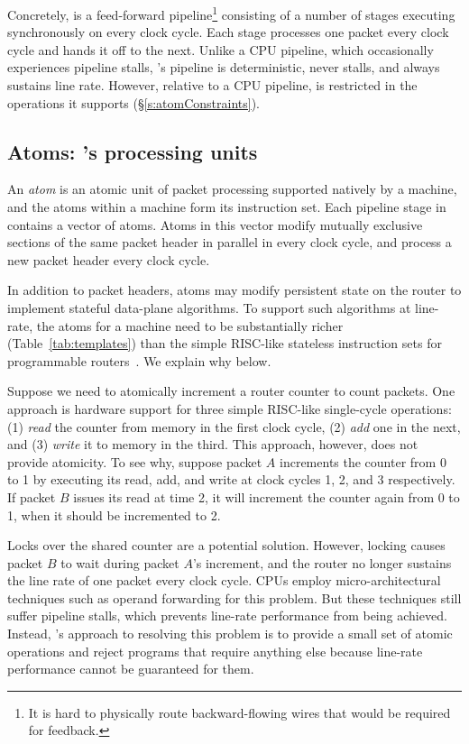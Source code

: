  Concretely, \absmachine is a feed-forward pipeline\footnote{It is hard to
physically route backward-flowing wires that would be required for feedback.}
consisting of a number of stages executing synchronously on every clock cycle.
Each stage processes one packet every clock cycle and hands it off to the next.
Unlike a CPU pipeline, which occasionally experiences pipeline stalls,
\absmachine's pipeline is deterministic, never stalls, and always sustains line
rate. However, relative to a CPU pipeline, \absmachine is restricted in the
operations it supports (\S\ref{s:atomConstraints}).

\subsection{Atoms: \absmachine's processing units}
\label{ss:atoms}
 An {\em atom} is an atomic unit of packet processing supported natively by a
\absmachine machine, and the atoms within a \absmachine machine form its
instruction set. Each pipeline stage in \absmachine contains a vector of atoms.
Atoms in this vector modify mutually exclusive sections of the same packet
header in parallel in every clock cycle, and process a new packet header every
clock cycle.

In addition to packet headers, atoms may modify persistent state on the router
to implement stateful data-plane algorithms. To support such algorithms at
line-rate, the atoms for a \absmachine machine need to be substantially richer
(Table~\ref{tab:templates}) than the simple RISC-like stateless instruction
sets for programmable routers~\cite{rmt}. We explain why below.

Suppose we need to atomically increment a router counter to count packets. One
approach is hardware support for three simple RISC-like single-cycle
operations: (1) \textit{read} the counter from memory in the first clock cycle,
(2) \textit{add} one in the next, and (3) \textit{write} it to memory in the
third.  This approach, however, does not provide atomicity. To see why, suppose
packet $A$ increments the counter from 0 to 1 by executing its read, add, and
write at clock cycles 1, 2, and 3 respectively.  If packet $B$ issues its read
at time 2, it will increment the counter again from 0 to 1, when it should be
incremented to 2.

Locks over the shared counter are a potential solution.  However, locking
causes packet $B$ to wait during packet $A$'s increment, and the router no
longer sustains the line rate of one packet every clock cycle. CPUs employ
micro-architectural techniques such as operand forwarding for this problem. But
these techniques still suffer pipeline stalls, which prevents line-rate
performance from being achieved. Instead, \absmachine's approach to resolving
this problem is to provide a small set of atomic operations and reject programs
that require anything else because line-rate performance cannot be guaranteed
for them.

